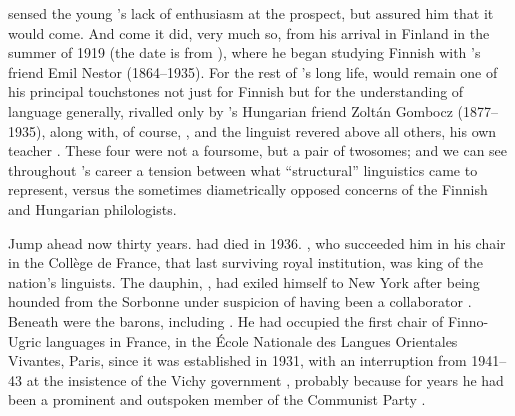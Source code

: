 \documentclass[output=paper]{langscibook}
\begin{document}
{\Meillet} sensed the young {\Sauvageot}'s lack of enthusiasm at the prospect, but assured him that it would come. And come it did, very much so, from his arrival in Finland in the summer of 1919 (the date is from \citealt[296]{Perrot2007}), where he began studying Finnish with {\Meillet}'s friend Emil Nestor {} (1864--1935). For the rest of {\Sauvageot}'s long life, {} would remain one of his principal touchstones not just for Finnish but for the understanding of language generally, rivalled only by {}'s Hungarian friend Zoltán Gombocz (1877--1935), along with, of course, {\Meillet}, and the linguist {\Meillet} revered above all others, his own teacher {\Saussure}. These four were not a foursome, but a pair of twosomes; and we can see throughout {\Sauvageot}'s career a tension between what ``structural'' linguistics came to represent, versus the sometimes diametrically opposed concerns of the Finnish and Hungarian philologists.

Jump ahead now thirty years. {\Meillet} had died in 1936. {\Benveniste}, who succeeded him in his chair in the Collège de France, that last surviving royal institution, was king of the nation's linguists. The dauphin, {\Martinet}, had exiled himself to New York after being hounded from the Sorbonne under suspicion of having been a collaborator \citep[see][]{Joseph2016}. Beneath {\Benveniste} were the barons, including {\Sauvageot}. He had occupied the first chair of Finno-Ugric languages in France, in the École Nationale des Langues Orientales Vivantes, Paris, since it was established in 1931, with an interruption from 1941--43 at the insistence of the Vichy government \citep[296]{Perrot2007}, probably because for years he had been a prominent and outspoken member of the Communist Party \citep[see][158]{Chevalier2006}.
\end{document}
